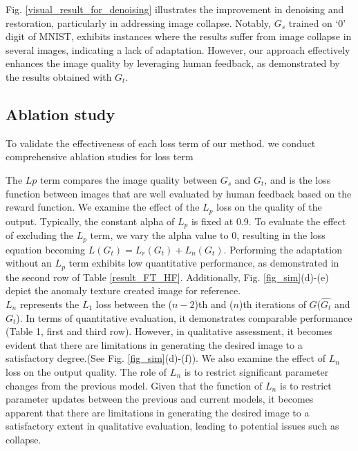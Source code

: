 \documentclass[lettersize,journal]{IEEEtran}
\begin{document}
 Fig. \ref{visual_result_for_denoising} illustrates the improvement in denoising and restoration, particularly in addressing image collapse. Notably, $G_s$ trained on `0' digit of MNIST, exhibits instances where the results suffer from image collapse in several images, indicating a lack of adaptation. However, our approach effectively enhances the image quality by leveraging human feedback, as demonstrated by the results obtained with $G_t$.

\subsection{Ablation study}
To  validate  the  effectiveness  of  each  loss term  of  our  method. we conduct comprehensive ablation studies for loss term

 The $Lp$ term compares the image quality between $G_s$ and $G_t$, and is the loss function between images that are well evaluated by human feedback based on the reward function. We examine the effect of the $L_p$ loss on the quality of the output. Typically, the constant alpha of $L_p$ is fixed at 0.9. To evaluate the effect of excluding the $L_p$ term, we vary the alpha value to 0, resulting in the loss equation becoming $L(G_t) = L_r(G_t) + L_{n}(G_t)$. Performing the adaptation without an $L_p$ term exhibits low quantitative performance, as demonstrated in the second row of Table \ref{result_FT_HF}. Additionally, Fig. \ref{fig_sim}(d)-(e) depict the anomaly texture created image for reference.\\
 $L_n$ represents the $L_1$ loss between the ($n-2$)th and ($n$)th iterations of $G$($\hat{G_t}$ and $G_t$). 
In terms of quantitative evaluation, it demonstrates comparable performance (Table 1, first and third row). However, in qualitative assessment, it becomes evident that there are limitations in generating the desired image to a satisfactory degree.(See Fig. \ref{fig_sim}(d)-(f)).
We also examine the effect of $L_n$ loss on the output quality. The role of $L_n$ is to restrict significant parameter changes from the previous model.
Given that the function of $L_n$ is to restrict parameter updates between the previous and current models, it becomes apparent that there are limitations in generating the desired image to a satisfactory extent in qualitative evaluation, leading to potential issues such as collapse.\\
\end{document}
